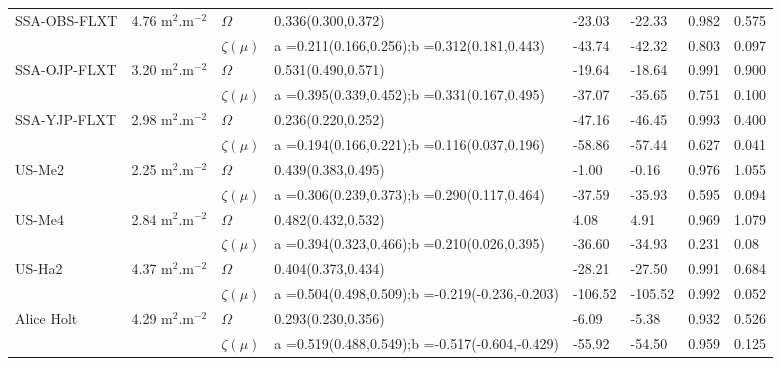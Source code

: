 \documentclass[a4paper,11pt]{report}
\begin{document}
\begin{sidewaystable}
\begin{tabular}{p{4.0cm} p{2.1cm} p{1.5cm} p{4.1cm} p{2.1cm} p{2.1cm} p{2.1cm} p{2.1cm}}
\multirow{2}{*}{SSA-OBS-FLXT} 
     & 4.76 m$^2$.m$^{-2}$ &  \bf $\Omega$         &  0.336(0.300,0.372) & -23.03 & -22.33 & 0.982 & 0.575\\
     & &  \bf $\zeta(\mu)$          &  a =0.211(0.166,0.256);\newline b =0.312(0.181,0.443) & -43.74	& -42.32 & 0.803 & 0.097
\\
\multirow{2}{*}{SSA-OJP-FLXT} 
     & 3.20 m$^2$.m$^{-2}$ &  \bf $\Omega$         &  0.531(0.490,0.571) & -19.64 & -18.64 & 0.991 & 0.900\\
    &  &  \bf $\zeta(\mu)$          &  a =0.395(0.339,0.452);\newline b =0.331(0.167,0.495) & -37.07 & -35.65 & 0.751 & 0.100\\
\multirow{2}{*}{SSA-YJP-FLXT} 
     & 2.98 m$^2$.m$^{-2}$ &  \bf $\Omega$         &  0.236(0.220,0.252) & -47.16 & -46.45 & 0.993 & 0.400\\
    &  &  \bf $\zeta(\mu)$          &  a =0.194(0.166,0.221);\newline b =0.116(0.037,0.196) & -58.86 & -57.44 & 0.627 & 0.041\\
\multirow{2}{*}{US-Me2} 
    & 2.25 m$^2$.m$^{-2}$ &  \bf $\Omega$         &  0.439(0.383,0.495) & -1.00 & -0.16 & 0.976 & 1.055\\
    &  &  \bf $\zeta(\mu)$         &  a =0.306(0.239,0.373);\newline b =0.290(0.117,0.464) & -37.59	& -35.93 & 0.595 & 0.094\\
\multirow{2}{*}{US-Me4} 
    & 2.84 m$^2$.m$^{-2}$ &  \bf $\Omega$         &  0.482(0.432,0.532) & 4.08 & 4.91 & 0.969 & 1.079\\
    &  &  \bf $\zeta(\mu)$         &  a =0.394(0.323,0.466);\newline b =0.210(0.026,0.395) & -36.60 & -34.93 & 0.231 & 0.08
\\
\multirow{2}{*}{US-Ha2} 
    & 4.37 m$^2$.m$^{-2}$ &  \bf $\Omega$        &   0.404(0.373,0.434) & -28.21 & -27.50 & 0.991 & 0.684\\
    &  &  \bf $\zeta(\mu)$          &  a =0.504(0.498,0.509);\newline b =-0.219(-0.236,-0.203) & -106.52 & -105.52 & 0.992 & 0.052\\
\hline
\multirow{1}{*}{Alice Holt} 
    & 4.29 m$^2$.m$^{-2}$ &  \bf $\Omega$         &  0.293(0.230,0.356) & -6.09 & -5.38 & 0.932 & 0.526\\
    &  &  \bf $\zeta(\mu)$          &  a =0.519(0.488,0.549);\newline b =-0.517(-0.604,-0.429) & -55.92 & -54.50 & 0.959 & 0.125\\

\end{tabular}
\end{sidewaystable}
\end{document}
